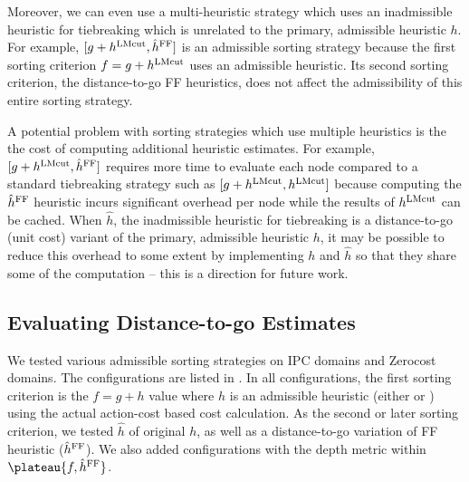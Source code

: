 Moreover, we can even use a multi-heuristic strategy which uses an inadmissible heuristic for tiebreaking which is unrelated to the primary, admissible heuristic $h$.
 For example, $[g+h^{\text{LMcut}},\hat{h}^{\text{FF}}]$ is an admissible sorting strategy
because the first sorting criterion $f=g+h^{\text{LMcut}}$ uses an admissible
\lmcut heuristic. Its second sorting criterion, the distance-to-go FF
heuristics, does not affect the admissibility of this entire sorting strategy.

A potential problem with sorting strategies which use multiple heuristics is the 
the cost of computing additional
heuristic estimates. For example, $[g+h^{\text{LMcut}},\hat{h}^{\text{FF}}]$ requires more time to evaluate each node compared to a standard tiebreaking strategy such as $[g+h^{\text{LMcut}},h^{\text{LMcut}}]$ because computing the $\hat{h}^{\text{FF}}$ heuristic incurs significant overhead per node while the results of $h^{\text{LMcut}}$ can be cached.
When $\hat{h}$, the inadmissible heuristic for tiebreaking is a distance-to-go (unit cost) variant of the primary, admissible heuristic $h$, it may be possible to reduce this overhead to some extent by implementing $h$ and $\hat{h}$ so that they share some of the computation  -- this is a direction for future work.

\subsection{Evaluating Distance-to-go Estimates}

We tested various admissible sorting strategies on IPC domains and Zerocost domains.
The configurations are listed in . 
In all configurations, the first sorting criterion is the $f=g+h$ value
where $h$ is an admissible heuristic (either \lmcut or \mands) using the actual action-cost based  cost calculation.
As the second or later sorting criterion,
we tested $\hat{h}$ of original $h$, as well as a distance-to-go variation of FF
heuristic ($\hat{h}^{\text{FF}}$).
We also added configurations with the depth metric within
$\plateau{f,\hat{h}^{\text{\ff}}}$.

